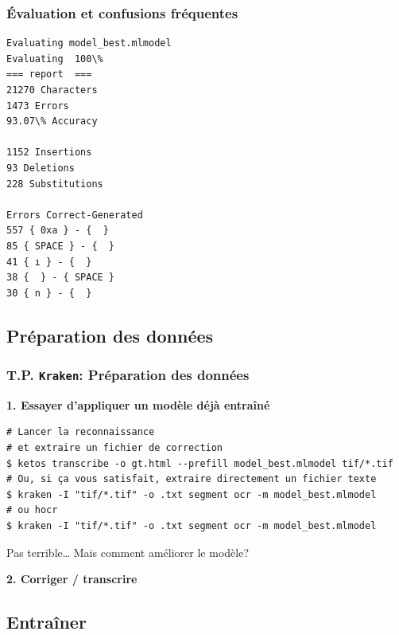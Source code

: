 \documentclass[10pt, compress,urlcolor=blue]{beamer}
\begin{document}
\begin{frame}[fragile]
\frametitle{Évaluation et confusions fréquentes}

\begin{verbatim}
Evaluating model_best.mlmodel
Evaluating  100\%          
=== report  ===
21270 Characters
1473 Errors
93.07\% Accuracy

1152 Insertions
93 Deletions
228 Substitutions

Errors Correct-Generated
557 { 0xa } - {  }
85 { SPACE } - {  }
41 { ı } - {  }
38 {  } - { SPACE }
30 { n } - {  }
\end{verbatim}
    
\end{frame}
	

\subsection{Préparation des données}

\begin{frame}[fragile]
\frametitle{T.P. \texttt{Kraken}: Préparation des données}

\textbf{1. Essayer d'appliquer un modèle déjà entraîné}
\begin{verbatim}
# Lancer la reconnaissance 
# et extraire un fichier de correction
$ ketos transcribe -o gt.html --prefill model_best.mlmodel tif/*.tif
# Ou, si ça vous satisfait, extraire directement un fichier texte
$ kraken -I "tif/*.tif" -o .txt segment ocr -m model_best.mlmodel
# ou hocr
$ kraken -I "tif/*.tif" -o .txt segment ocr -m model_best.mlmodel
\end{verbatim}

Pas terrible… Mais comment améliorer le modèle?

\textbf{2. Corriger / transcrire}
\end{frame}

\subsection{Entraîner}
\end{document}
